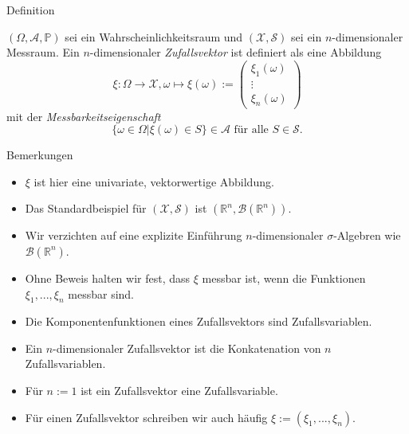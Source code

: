 \documentclass[
  8pt,
  ignorenonframetext,
]{beamer}
\providecommand{\tightlist}{%
  \setlength{\itemsep}{0pt}\setlength{\parskip}{0pt}}
\begin{document}
\begin{frame}{Definition}
\protect\hypertarget{definition}{}
\small
\begin{definition}[Zufallsvektor]
\justifying
$(\Omega, \mathcal{A}, \mathbb{P})$ sei ein Wahrscheinlichkeitsraum und 
$(\mathcal{X},\mathcal{S})$ sei ein $n$-dimensionaler Messraum. 
Ein $n$-dimensionaler \textit{Zufallsvektor} ist definiert als eine Abbildung
\begin{equation}
\xi:\Omega \to \mathcal{X}, \omega \mapsto \xi(\omega) :=
\begin{pmatrix}
\xi_1(\omega) \\
\vdots      \\
\xi_n(\omega)
\end{pmatrix}
\end{equation}
mit der \textit{Messbarkeitseigenschaft}
\begin{equation}
\{\omega \in \Omega|\xi(\omega) \in S \} \in \mathcal{A} \mbox{ für alle } S \in \mathcal{S}.
\end{equation}
\end{definition}
\vspace{-2mm}
\footnotesize

Bemerkungen \vspace{-2mm}

\begin{itemize}
\tightlist
\item
  \(\xi\) ist hier eine univariate, vektorwertige Abbildung.
\item
  Das Standardbeispiel für \((\mathcal{X},\mathcal{S})\) ist
  \((\mathbb{R}^n, \mathcal{B}(\mathbb{R}^n))\).
\item
  Wir verzichten auf eine explizite Einführung \(n\)-dimensionaler
  \(\sigma\)-Algebren wie \(\mathcal{B}(\mathbb{R}^n)\).
\item
  Ohne Beweis halten wir fest, dass \(\xi\) messbar ist, wenn die
  Funktionen \(\xi_1,...,\xi_n\) messbar sind.
\item
  Die Komponentenfunktionen eines Zufallsvektors sind Zufallsvariablen.
\item
  Ein \(n\)-dimensionaler Zufallsvektor ist die Konkatenation von \(n\)
  Zufallsvariablen.
\item
  Für \(n := 1\) ist ein Zufallsvektor eine Zufallsvariable.
\item
  Für einen Zufallsvektor schreiben wir auch häufig
  \(\xi:= (\xi_1,...,\xi_n)\).
\end{itemize}
\end{frame}
\end{document}
